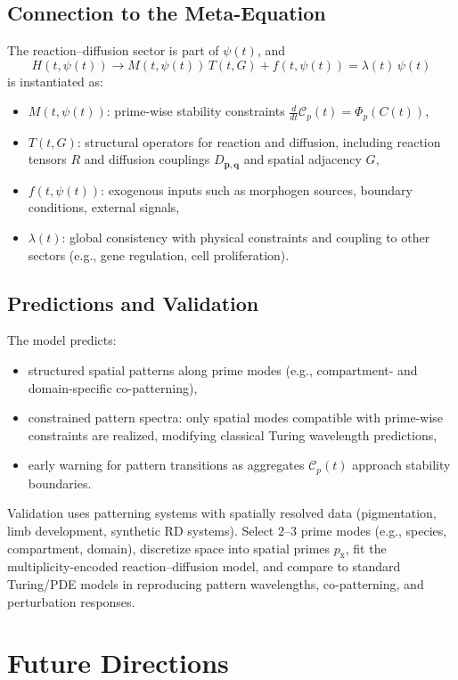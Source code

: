 \documentclass[11pt]{article}
\begin{document}
\subsection{Connection to the Meta-Equation}
The reaction--diffusion sector is part of $\psi(t)$, and
\[
H(t,\psi(t))
\to
M(t,\psi(t))\,T(t,G)
+
f(t,\psi(t))
=
\lambda(t)\,\psi(t)
\]
is instantiated as:
\begin{itemize}
    \item $M(t,\psi(t))$: prime-wise stability constraints $\frac{d}{dt}\mathcal{C}_p(t) = \Phi_p(C(t))$,
    \item $T(t,G)$: structural operators for reaction and diffusion, including reaction tensors $R$ and diffusion couplings $D_{\mathbf{p},\mathbf{q}}$ and spatial adjacency $G$,
    \item $f(t,\psi(t))$: exogenous inputs such as morphogen sources, boundary conditions, external signals,
    \item $\lambda(t)$: global consistency with physical constraints and coupling to other sectors (e.g., gene regulation, cell proliferation).
\end{itemize}

\subsection{Predictions and Validation}
The model predicts:
\begin{itemize}
    \item structured spatial patterns along prime modes (e.g., compartment- and domain-specific co-patterning),
    \item constrained pattern spectra: only spatial modes compatible with prime-wise constraints are realized, modifying classical Turing wavelength predictions,
    \item early warning for pattern transitions as aggregates $\mathcal{C}_p(t)$ approach stability boundaries.
\end{itemize}
Validation uses patterning systems with spatially resolved data (pigmentation, limb development, synthetic RD systems). Select $2$--$3$ prime modes (e.g., species, compartment, domain), discretize space into spatial primes $p_{\text{x}}$, fit the multiplicity-encoded reaction--diffusion model, and compare to standard Turing/PDE models in reproducing pattern wavelengths, co-patterning, and perturbation responses.

\section{Future Directions}
\label{sec:future}
\end{document}
